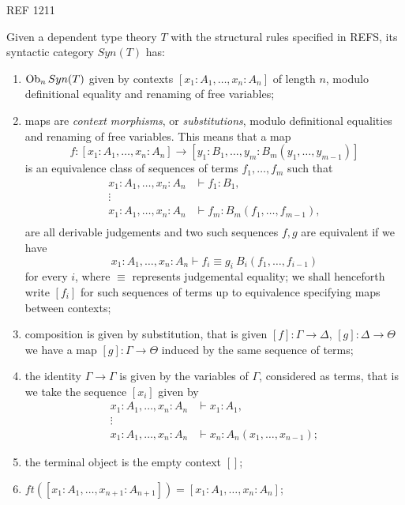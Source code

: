 \documentclass[a4paper,fontsize=12pt]{scrartcl}
\begin{document}
\begin{construction}
  REF 1211

  Given a dependent type theory $T$ with the structural rules specified in REFS,
  its syntactic category $Syn(T)$ has:
  \begin{enumerate}
    \item $\operatorname{Ob}_nSyn(T)$ given by contexts $[x_1:A_1,\ldots,x_n:A_n]$ of length
      $n$, modulo definitional equality and renaming of free variables;
    \item maps are \emph{context morphisms}, or \emph{substitutions}, modulo
      definitional equalities and renaming of free variables. This means that a
      map
      \[f\colon[x_1:A_1,\ldots,x_n:A_n]\rightarrow[y_1:B_1,\ldots,y_m:B_m(y_1,\ldots,y_{m-1})]\]
      is an equivalence class of sequences of terms $f_1,\ldots,f_m$ such that
      \begin{align*}
        x_1:A_1,\ldots,x_n:A_n &\vdash f_1:B_1, \\
        \vdots & \\
        x_1:A_1,\ldots,x_n:A_n &\vdash f_m:B_m(f_1,\ldots,f_{m-1}), \\
      \end{align*}
      are all derivable judgements and two such sequences $f,g$ are equivalent
      if we have
      \[x_1:A_1,\ldots,x_n:A_n\vdash f_i\equiv g_i\:B_i(f_1,\ldots,f_{i-1})\]
      for every $i$, where $\equiv$ represents judgemental equality; we shall
      henceforth write $[f_i]$ for such sequences of terms up to equivalence
      specifying maps between contexts;
    \item composition is given by substitution, that is given
      $[f]\colon\Gamma\rightarrow\Delta$, $[g]\colon\Delta\rightarrow\Theta$ we
      have a map $[g]\colon\Gamma\rightarrow\Theta$ induced by the same sequence
      of terms;
    \item the identity $\Gamma\rightarrow\Gamma$ is given by the variables of
      $\Gamma$, considered as
      terms, that is we take the sequence $[x_i]$ given by
      \begin{align*}
        x_1:A_1,\ldots,x_n:A_n &\vdash x_1:A_1, \\
        \vdots & \\
        x_1:A_1,\ldots,x_n:A_n &\vdash x_n:A_n(x_1,\ldots,x_{n-1});
      \end{align*}
    \item the terminal object is the empty context $[]$;
    \item
      $ft([x_1:A_1,\ldots,x_{n+1}:A_{n+1}])=[x_1:A_1,\ldots,x_n:A_n]$;

\end{enumerate}
\end{construction}
\end{document}
